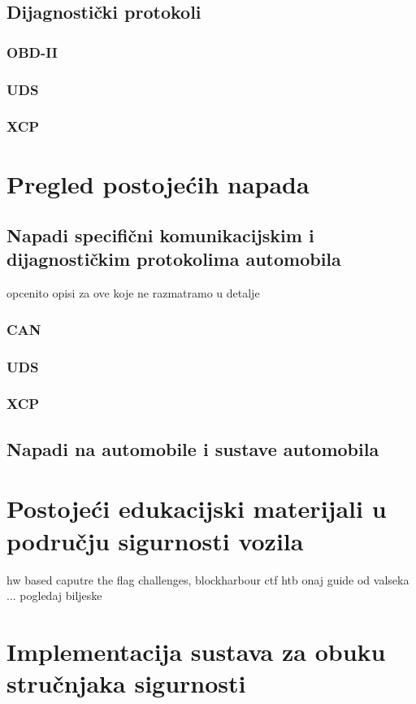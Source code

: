 \documentclass[times, utf8, diplomski, numeric]{fer}
\begin{document}
\section{Dijagnostički protokoli}
\subsection{OBD-II}
\subsection{UDS}
\subsection{XCP}

\chapter{Pregled postojećih napada}
\section{Napadi specifični komunikacijskim i dijagnostičkim protokolima automobila}
opcenito opisi za ove koje ne razmatramo u detalje
\subsection{CAN}
\subsection{UDS}
\subsection{XCP}
\section{Napadi na automobile i sustave automobila}
\chapter{Postojeći edukacijski materijali u području sigurnosti vozila}
hw based caputre the flag challenges,
blockharbour ctf
htb
onaj guide od valseka
... pogledaj biljeske
\chapter{Implementacija sustava za obuku stručnjaka sigurnosti}
\end{document}
